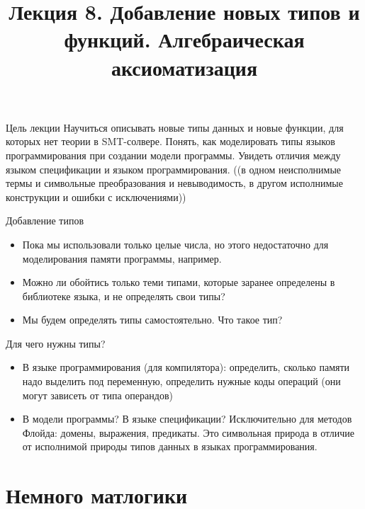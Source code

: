 \documentclass[hyperref={unicode=true}]{beamer}
\title{Лекция 8. Добавление новых типов и функций.
Алгебраическая аксиоматизация}
\author{}
\date{}
\begin{document}
	\begin{frame}{}
		\titlepage
	\end{frame}

    \begin{frame}{Цель лекции}
    Научиться описывать новые типы данных и
    новые функции, для которых нет теории в SMT-солвере.
    Понять, как моделировать типы языков
    программирования при создании модели программы.
    Увидеть отличия между языком спецификации и
    языком программирования. ((в одном неисполнимые термы и
                символьные преобразования и невыводимость,
                в другом исполнимые конструкции и ошибки с исключениями))
    \end{frame}



    \begin{frame}{Добавление типов}
    \begin{itemize}
    \item
    Пока мы использовали только целые числа, но этого
    недостаточно для моделирования памяти программы, например.
    \item
    Можно ли обойтись только теми типами, которые заранее
    определены в библиотеке языка, и не определять свои типы?
    \item
    Мы будем определять типы самостоятельно. Что такое тип?
    \end{itemize}
    \end{frame}

    \begin{frame}{Для чего нужны типы?}
    \begin{itemize}
    \item
    В языке программирования (для компилятора):
    определить, сколько памяти надо выделить под переменную,
    определить нужные коды операций (они могут зависеть
            от типа операндов)
    \item
    В модели программы?
    В языке спецификации?
    Исключительно для методов Флойда: домены, выражения,
    предикаты. Это символьная природа в отличие от
    исполнимой природы типов данных в языках программирования.
    \end{itemize}
    \end{frame}

    \section{Немного матлогики}
\end{document}
